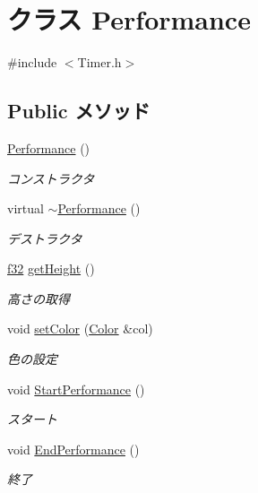 \hypertarget{class_performance}{\section{クラス Performance}
\label{class_performance}
}


{\ttfamily \#include $<$Timer.\-h$>$}

\subsection*{Public メソッド}
\begin{DoxyCompactItemize}
\item 
\hyperlink{class_performance_ac3f9a91ae5b8488e75385901497b0636}{Performance} ()
\begin{DoxyCompactList}\small\item\em コンストラクタ \end{DoxyCompactList}\item 
virtual \hyperlink{class_performance_a1a7af5c73f8bdd80ec08872cc2992b82}{$\sim$\-Performance} ()
\begin{DoxyCompactList}\small\item\em デストラクタ \end{DoxyCompactList}\item 
\hyperlink{_main_8h_a5f6906312a689f27d70e9d086649d3fd}{f32} \hyperlink{class_performance_a8be0a1eefdce743597d54297af96a145}{get\-Height} ()
\begin{DoxyCompactList}\small\item\em 高さの取得 \end{DoxyCompactList}\item 
void \hyperlink{class_performance_aa7d8705a7666adadb990add57e8272de}{set\-Color} (\hyperlink{struct_color}{Color} \&col)
\begin{DoxyCompactList}\small\item\em 色の設定 \end{DoxyCompactList}\item 
void \hyperlink{class_performance_a09224f7a02ac3267299ebfa5956b1dd2}{Start\-Performance} ()
\begin{DoxyCompactList}\small\item\em スタート \end{DoxyCompactList}\item 
void \hyperlink{class_performance_aed413eee749dfdb1a62d4e127f51f822}{End\-Performance} ()
\begin{DoxyCompactList}\small\item\em 終了 \end{DoxyCompactList}\item 

\end{DoxyCompactItemize}
